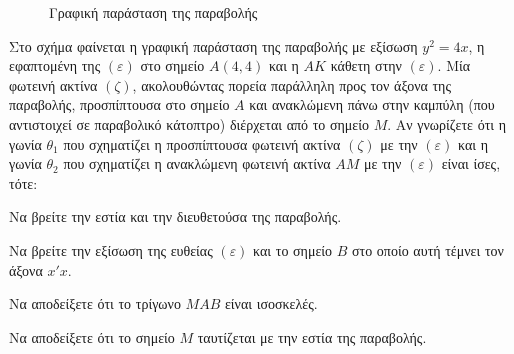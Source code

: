 \begin{figure}
\caption{Γραφική παράσταση της παραβολής}
\end{figure}

Στο σχήμα φαίνεται η γραφική παράσταση της παραβολής με εξίσωση $y^2 = 4x$, η
εφαπτομένη της $(\varepsilon)$ στο σημείο $A(4,4)$ και η $AK$ κάθετη στην $(\varepsilon)$. Μία φωτεινή ακτίνα $(\zeta)$,
ακολουθώντας πορεία παράλληλη προς τον άξονα της παραβολής, προσπίπτουσα στο
σημείο $A$ και ανακλώμενη πάνω στην καμπύλη (που αντιστοιχεί σε παραβολικό κάτοπτρο)
διέρχεται από το σημείο $M$. Αν γνωρίζετε ότι η γωνία $\theta_1$ που σχηματίζει η προσπίπτουσα
φωτεινή ακτίνα $(\zeta)$ με την $(\varepsilon)$ και η γωνία $\theta_2$ που σχηματίζει η ανακλώμενη φωτεινή ακτίνα
$AM$ με την $(\varepsilon)$ είναι ίσες, τότε:
\begin{alist}
\item Να βρείτε την εστία και την διευθετούσα της παραβολής. 
\item Να βρείτε την εξίσωση της ευθείας $(\varepsilon)$ και το σημείο $B$ στο οποίο αυτή τέμνει τον άξονα
$x'x$. 
\item Να αποδείξετε ότι το τρίγωνο $MAB$ είναι ισοσκελές. 
\item Να αποδείξετε ότι το σημείο $M$ ταυτίζεται με την εστία της παραβολής. 
\end{alist}